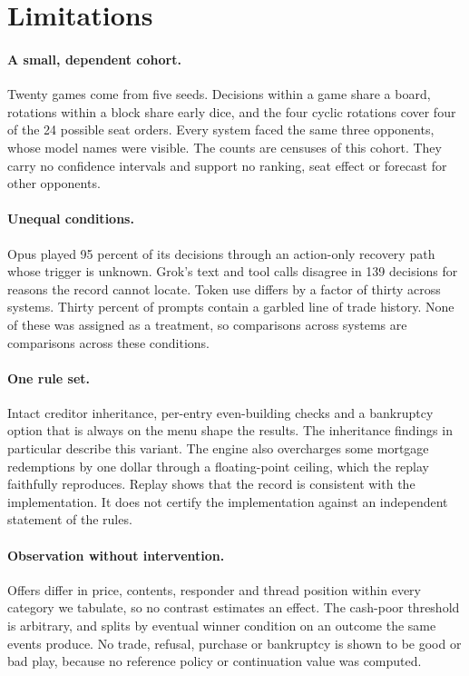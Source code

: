 \section{Limitations}
\label{sec:limitations}

\paragraph{A small, dependent cohort.} Twenty games come from five seeds. Decisions within a game share a board, rotations within a block share early dice, and the four cyclic rotations cover four of the 24 possible seat orders. Every system faced the same three opponents, whose model names were visible. The counts are censuses of this cohort. They carry no confidence intervals and support no ranking, seat effect or forecast for other opponents.

\paragraph{Unequal conditions.} Opus played 95 percent of its decisions through an action-only recovery path whose trigger is unknown. Grok's text and tool calls disagree in 139 decisions for reasons the record cannot locate. Token use differs by a factor of thirty across systems. Thirty percent of prompts contain a garbled line of trade history. None of these was assigned as a treatment, so comparisons across systems are comparisons across these conditions.

\paragraph{One rule set.} Intact creditor inheritance, per-entry even-building checks and a bankruptcy option that is always on the menu shape the results. The inheritance findings in particular describe this variant. The engine also overcharges some mortgage redemptions by one dollar through a floating-point ceiling, which the replay faithfully reproduces. Replay shows that the record is consistent with the implementation. It does not certify the implementation against an independent statement of the rules.

\paragraph{Observation without intervention.} Offers differ in price, contents, responder and thread position within every category we tabulate, so no contrast estimates an effect. The cash-poor threshold is arbitrary, and splits by eventual winner condition on an outcome the same events produce. No trade, refusal, purchase or bankruptcy is shown to be good or bad play, because no reference policy or continuation value was computed.

